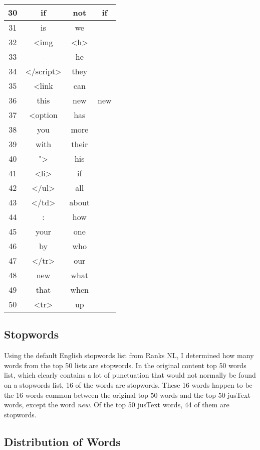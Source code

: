 \documentclass[a4paper,12pt]{article}
\begin{document}
{\begin{table}[H]
\begin{tabular}{ | c | c | c | c | }
30 & if & not & if \\ \hline
31 & is & we & \\ \hline
32 & \textless{}img & \textless{}h\textgreater{} & \\ \hline
33 & - & he & \\ \hline
34 & \textless{}/script\textgreater{} & they & \\ \hline
35 & \textless{}link & can & \\ \hline
36 & this & new & new \\ \hline
37 & \textless{}option & has & \\ \hline
38 & you & more & \\ \hline
39 & with & their & \\ \hline
40 & "\textgreater{} & his & \\ \hline
41 & \textless{}li\textgreater{} & if & \\ \hline
42 & \textless{}/ul\textgreater{} & all & \\ \hline
43 & \textless{}/td\textgreater{} & about & \\ \hline
44 & : & how & \\ \hline
45 & your & one & \\ \hline
46 & by & who & \\ \hline
47 & \textless{}/tr\textgreater{} & our & \\ \hline
48 & new & what & \\ \hline
49 & that & when & \\ \hline
50 & \textless{}tr\textgreater{} & up & \\ \hline
\end{tabular}
\end{table}
}

\subsection{Stopwords}
Using the default English stopwords list from Ranks NL, I determined how many words from the top 50 lists are
stopwords. In the original content top 50 words list, which clearly contains a lot of punctuation that would not
normally be found on a stopwords list, 16 of the words are stopwords. These 16 words happen to be the 16 words
common between the original top 50 words and the top 50 jusText words, except the word \emph{new}. Of the top 50
jusText words, 44 of them are stopwords.

\subsection{Distribution of Words}







\end{document}

